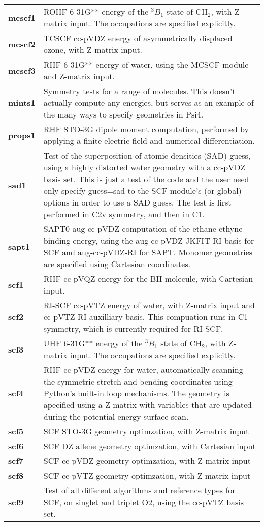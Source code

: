 \begin{tabular*}{\textwidth}[tb]{p{}p{}}
{\bf mcscf1} &  ROHF 6-31G** energy of the $^3B_1$ state of CH$_2$, with Z-matrix input. The occupations are specified explicitly.\\
{\bf mcscf2} &  TCSCF cc-pVDZ  energy of asymmetrically displaced ozone, with Z-matrix input.\\
{\bf mcscf3} &  RHF 6-31G** energy of water, using the MCSCF module and Z-matrix input.\\
{\bf mints1} &  Symmetry tests for a range of molecules.  This doesn't actually compute any energies, but serves as an example of the many ways to specify geometries in Psi4.\\
{\bf props1} &  RHF STO-3G dipole moment computation, performed by applying a finite electric field and numerical differentiation.\\
{\bf sad1} &  Test of the superposition of atomic densities (SAD) guess, using a highly distorted water geometry with a cc-pVDZ basis set.  This is just a test of the code and the user need only specify guess=sad to the SCF module's (or global) options in order to use a SAD guess. The test is first performed in C2v symmetry, and then in C1.\\
{\bf sapt1} &  SAPT0 aug-cc-pVDZ computation of the ethane-ethyne binding energy, using the aug-cc-pVDZ-JKFIT RI basis for SCF and aug-cc-pVDZ-RI for SAPT.  Monomer geometries are specified using Cartesian coordinates.\\
{\bf scf1} &  RHF cc-pVQZ energy for the BH molecule, with Cartesian input.\\
{\bf scf2} &  RI-SCF cc-pVTZ energy of water, with Z-matrix input and cc-pVTZ-RI auxilliary basis. This compuation runs in C1 symmetry, which is currently required for RI-SCF.\\
{\bf scf3} &  UHF 6-31G** energy of the $^3B_1$ state of CH$_2$, with Z-matrix input. The occupations are specified explicitly.\\
{\bf scf4} &  RHF cc-pVDZ energy for water, automatically scanning the symmetric stretch and bending coordinates using Python's built-in loop mechanisms.  The geometry is apecified using a Z-matrix with variables that are updated during the potential energy surface scan.\\
{\bf scf5} &  SCF STO-3G geometry optimzation, with Z-matrix input\\
{\bf scf6} &  SCF DZ allene geometry optimzation, with Cartesian input\\
{\bf scf7} &  SCF cc-pVDZ geometry optimzation, with Z-matrix input\\
{\bf scf8} &  SCF cc-pVTZ geometry optimzation, with Z-matrix input\\
{\bf scf9} &  Test of all different algorithms and reference types for SCF, on singlet and triplet O2, using the cc-pVTZ basis set.\\
\end{tabular*}